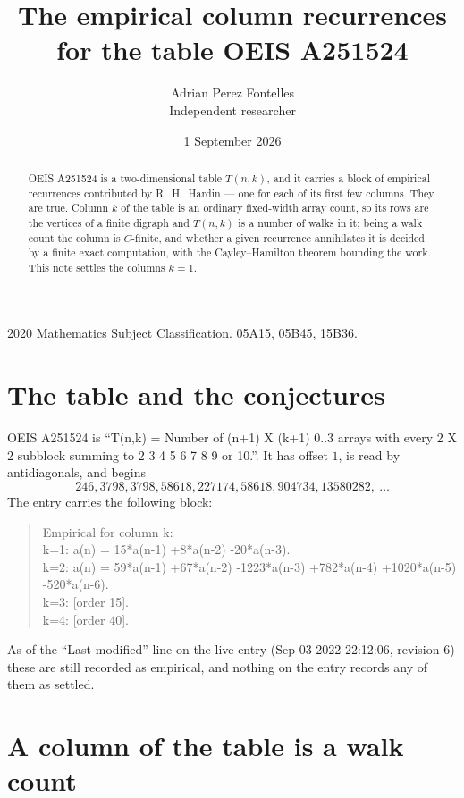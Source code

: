 \documentclass[11pt,a4paper]{article}
\title{The empirical column recurrences for the table OEIS A251524}
\author{Adrian Perez Fontelles\\ \small Independent researcher}
\date{1 September 2026}
\theoremstyle{plain}
\theoremstyle{definition}
\begin{document}
\maketitle

\begin{abstract}
OEIS A251524 is a two-dimensional table $T(n,k)$, and it carries a block of empirical
recurrences contributed by R.~H.~Hardin --- one for each of its first few columns. They are
true. Column $k$ of the table is an ordinary fixed-width array count, so its rows are the
vertices of a finite digraph and $T(n,k)$ is a number of walks in it; being a walk count the
column is $C$-finite, and whether a given recurrence annihilates it is decided by a finite
exact computation, with the Cayley--Hamilton theorem bounding the work. This note settles the columns $k=1$.
\end{abstract}

\noindent\small 2020 Mathematics Subject Classification. 05A15, 05B45, 15B36.\normalsize

\section{The table and the conjectures}

OEIS A251524 is ``T(n,k) = Number of (n+1) X (k+1) 0..3 arrays with every 2 X 2 subblock summing to 2 3 4 5 6 7 8 9 or 10.''. It has offset $1$, is
read by antidiagonals, and begins
\[
246, 3798, 3798, 58618, 227174, 58618, 904734, 13580282,\ \dots
\]
The entry carries the following block:
\begin{quote}\small
Empirical for column k:\\
k=1: a(n) = 15*a(n-1) +8*a(n-2) -20*a(n-3).\\
k=2: a(n) = 59*a(n-1) +67*a(n-2) -1223*a(n-3) +782*a(n-4) +1020*a(n-5) -520*a(n-6).\\
k=3: [order 15].\\
k=4: [order 40].\\
\end{quote}
As of the ``Last modified'' line on the live entry (Sep 03 2022 22:12:06, revision 6) these are still
recorded as empirical, and nothing on the entry records any of them as settled.

\section{A column of the table is a walk count}
\end{document}
